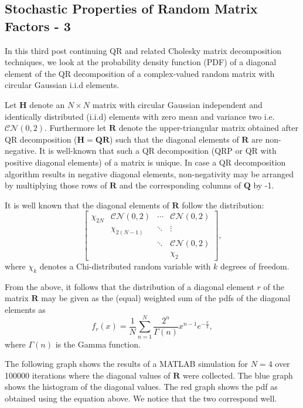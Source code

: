 \subsection{Stochastic Properties of Random Matrix Factors - 3}

In this third post continuing QR and related Cholesky matrix decomposition techniques, we look at the probability density function (PDF) of a diagonal element of the QR decomposition of a complex-valued random matrix with circular Gaussian i.i.d elements.

Let $\mathbf{H}$ denote an $N\times N$ matrix with circular Gaussian independent and identically distributed (i.i.d) elements with zero mean and variance two i.e. $\mathcal{CN}(0,2)$. Furthermore let $\mathbf{R}$ denote the upper-triangular matrix obtained after QR decomposition ($\mathbf{H} = \mathbf{Q}\mathbf{R}$) such that the diagonal elements of $\mathbf{R}$ are non-negative. It is well-known that such a QR decomposition (QRP or QR with positive diagonal elements) of a matrix is unique. In case a QR decomposition algorithm results in negative diagonal elements, non-negativity may be arranged by multiplying those rows of $\mathbf{R}$ and the corresponding columns of $\mathbf{Q}$ by -1.

It is well known that the diagonal elements of $\mathbf{R}$ follow the distribution:
$$
\begin{bmatrix}
	\chi_{2N} & \mathcal{CN}(0,2) & \cdots &  \mathcal{CN}(0,2)\\
	& \chi_{2(N-1)} & \ddots & \vdots\\
	& & \ddots & \mathcal{CN}(0,2)\\
	& & & \chi_{2}
\end{bmatrix},
$$
where $\chi_{k}$ denotes a Chi-distributed random variable with $k$ degrees of freedom.

From the above, it follows that the distribution of a diagonal element $r$ of the matrix $\mathbf{R}$ may be given as the (equal) weighted sum of the pdfs of the diagonal elements as
$$
f_r(x) = \frac{1}{N} \sum_{n=1}^{N} \frac{2^{n}}{\Gamma(n)} x^{n-1} e^{-\frac{x}{2}},
$$
where $\Gamma(n)$ is the Gamma function.

The following graph shows the results of a MATLAB simulation for $N=4$ over 100000 iterations where the diagonal values of $\mathbf{R}$ were collected. The blue graph shows the histogram of the diagonal values. The red graph shows the pdf as obtained using the equation above. We notice that the two correspond well.

